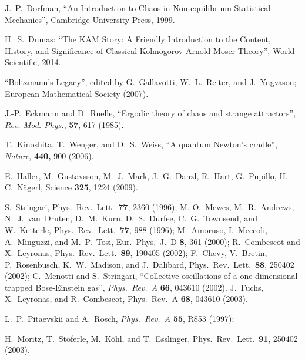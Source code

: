 \documentclass[onecolumn,pra]{revtex4-1}
\begin{document}
%
% 



\begin{thebibliography}{1}


 J.~P.~Dorfman, ``An Introduction to Chaos in Non-equilibrium Statistical
  Mechanics'', Cambridge University Press, 1999.

 H.~S.~Dumas: ``The KAM Story: A Friendly Introduction to the Content,
History, and Significance of Classical Kolmogorov-Arnold-Moser Theory'', World Scientific, 2014. 

 ``Boltzmann's Legacy'', edited by G.~Gallavotti, W.~L.~Reiter, and
  J.~Yngvason; European Mathematical Society (2007).

  J.-P.~Eckmann and D.~Ruelle,
  ``Ergodic theory of chaos and strange attractors'', 
  \emph{Rev. Mod. Phys.}, {\bf 57}, 617  (1985).


T.~Kinoshita, T.~Wenger, and D.~S.~Weiss, ``A quantum Newton's cradle'', {\em Nature}, {\bf 440,} 900 (2006). 


 E.~Haller, M.~Gustavsson, M.~J.~Mark, 
J.~G.~Danzl,  R.~Hart, G.~Pupillo, H.-C.~N\"agerl, Science \textbf{325}, 1224 
(2009). 

 

S.~Stringari, Phys.\ Rev.\ Lett.\ \textbf{77}, 2360 (1996); 
%
M.-O.~Mewes, M.~R.~Andrews, N.~J.~van~Druten, D.~M.~Kurn, D.~S.~Durfee, 
C.~G.~Townsend, and W.~Ketterle, Phys.\ Rev.\ Lett.\ \textbf{77}, 988 (1996);
%
M.~Amoruso, I.~Meccoli, A.~Minguzzi, and M.~P.~Tosi, Eur.\ Phys.\ J.~D \textbf{8}, 361 (2000);
%
R.~Combescot and X.~Leyronas, Phys.\ Rev.\ Lett.\ \textbf{89}, 190405 (2002);
%
F.~Chevy, V.~Bretin, P.~Rosenbusch, K.~W.~Madison, and J.~Dalibard, 
Phys.\ Rev.\ Lett.\ \textbf{88}, 250402 (2002);
%
C.~Menotti and S.~Stringari, ``Collective oscillations of a one-dimensional trapped Bose-Einstein
gas'', {\em Phys.\ Rev.\ A} \textbf{66}, 043610 (2002).
%
J.~Fuchs, X.~Leyronas, and R.~Combescot, Phys.\ Rev.\ A \textbf{68}, 043610 (2003).

%
L.~P.~Pitaevskii and A.~Rosch, {\em Phys.\ Rev.\ A} \textbf{55}, R853 (1997);


 H.~Moritz, T.~St\"oferle, M.~K\"ohl, and 
T.~Esslinger,
Phys.\ Rev.\ Lett.\ \textbf{91}, 250402 (2003).



\end{thebibliography}
\end{document}

